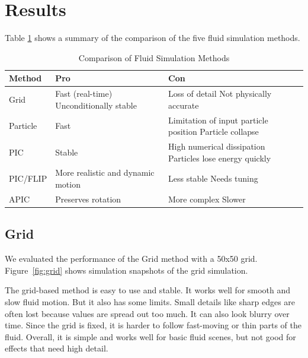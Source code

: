 \section{Results}

Table \ref{tab:fluid_comparison} shows a summary of the comparison of the five fluid simulation methods.

\begin{table}[!htbp]
\centering
\caption{Comparison of Fluid Simulation Methods}
\label{tab:fluid_comparison}
\begin{tabularx}{\columnwidth}{l X X}
\toprule
\textbf{Method} & \textbf{Pro} & \textbf{Con} \\
\midrule
Grid&
Fast (real-time) \newline
Unconditionally stable &
Loss of detail \newline
Not physically accurate \\
\midrule
Particle&
Fast &
Limitation of input particle position \newline
Particle collapse \\
\midrule
PIC&
Stable &
High numerical dissipation \newline
Particles lose energy quickly \\
\midrule
PIC/FLIP &
More realistic and dynamic motion &
Less stable \newline
Needs tuning \\
\midrule
APIC &
Preserves rotation &
More complex \newline
Slower \\
\bottomrule
\end{tabularx}
\end{table}

\subsection{Grid}

We evaluated the performance of the Grid method with a 50x50 grid. Figure~\ref{fig:grid} shows simulation snapshots of the grid simulation.

The grid-based method is easy to use and stable. It works well for smooth and slow fluid motion. But it also has some limits. Small details like sharp edges are often lost because values are spread out too much. It can also look blurry over time. Since the grid is fixed, it is harder to follow fast-moving or thin parts of the fluid. Overall, it is simple and works well for basic fluid scenes, but not good for effects that need high detail.

